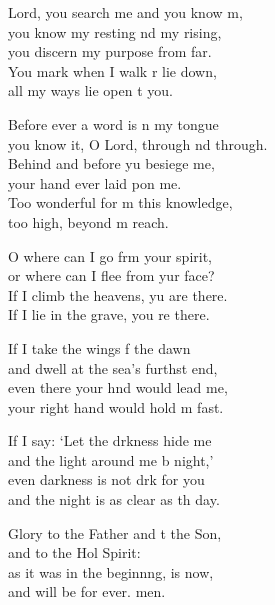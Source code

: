 \settowidth{\versewidth}{you know it, O Lord, through and through.}
\begin{psalmverse}%
  \begin{patverse}
 Lord, you search me and you know m,\Flex\\
you know my resting nd my rising,\Med\\
you discern my purpose from far.\\
You mark when I walk r lie down,\Med\\
all my ways lie open t you.

Before ever a word is n my tongue\Med\\
you know it, O Lord, through nd through.\\
Behind and before yu besiege me,\Med\\
your hand ever laid pon me.\\
Too wonderful for m this knowledge,\Med\\
too high, beyond m reach.

O where can I go frm your spirit,\Med\\
or where can I flee from yur face?\\
If I climb the heavens, yu are there.\Med\\
If I lie in the grave, you re there.

If I take the wings f the dawn\Med\\
and dwell at the sea’s furthst end,\\
even there your hnd would lead me,\Med\\
your right hand would hold m fast.

If I say: ‘Let the drkness hide me\Med\\
and the light around me b night,’\\
even darkness is not drk for you\Med\\
and the night is as clear as th day.

Glory to the Father and t the Son,\Med\\
and to the Hol Spirit:\\
as it was in the beginn\pointup{\i}ng, is now,\Med\\
and will be for ever. men.
  \end{patverse}
\end{psalmverse}
